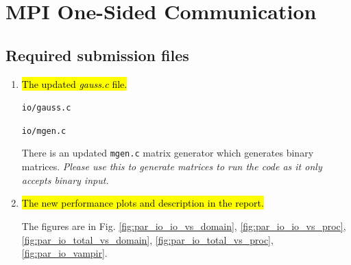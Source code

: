 \section{MPI One-Sided Communication}
\subsection{Required submission files}
\begin{enumerate}
  \item \hl{The updated \emph{gauss.c} file.}
  
  \verb!io/gauss.c!

  \verb!io/mgen.c!
  
  There is an updated \verb!mgen.c! matrix generator which generates binary matrices.
  \emph{Please use this to generate matrices to run the code as it only accepts binary input.}

  \item \hl{The new performance plots and description in the report.}
  
  The figures are in Fig. \ref{fig:par_io_io_vs_domain}, \ref{fig:par_io_io_vs_proc},
  \ref{fig:par_io_total_vs_domain}, \ref{fig:par_io_total_vs_proc}, \ref{fig:par_io_vampir}.

\end{enumerate}

